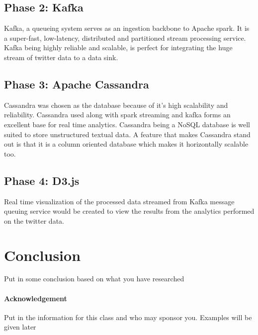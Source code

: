 \documentclass[9pt,twocolumn,twoside]{../../styles/osajnl}
\begin{document}
\subsection{Phase 2: Kafka}
Kafka, a queueing system serves as an ingestion backbone to Apache spark. It is a super-fast, low-latency, distributed and partitioned stream processing service. Kafka being highly reliable and scalable, is perfect for integrating the huge stream of twitter data to a data sink. 

\subsection{Phase 3: Apache Cassandra}
Cassandra was chosen as the database because of it's high scalability and reliability. Cassandra used along with spark streaming and kafka forms an excellent base for real time analytics. Cassandra being a NoSQL database is well suited to store unstructured textual data. A feature that makes Cassandra stand out is that it is a column oriented database which makes it horizontally scalable too. 

\subsection{Phase 4: D3.js}

Real time visualization of the processed data streamed from Kafka message queuing service would be created to view the results from the analytics performed on the twitter data.


\section{Conclusion}

Put in some conclusion based on what you have researched

\paragraph{Acknowledgement}

Put in the information for this class and who may sponsor
you. Examples will be given later

\end{document}
